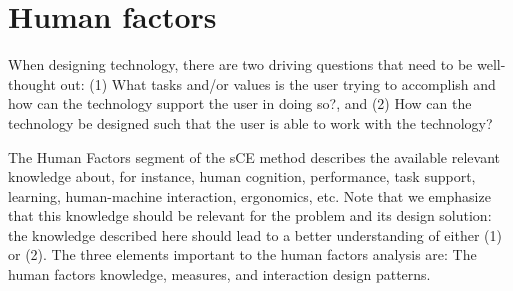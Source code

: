 \section{Human factors}
\label{sec:human-factors}
When designing technology, there are two driving questions that need to be well-thought out: (1) What tasks and/or values is the user trying to accomplish and how can the technology support the user in doing so?, and (2) How can the technology be designed such that the user is able to work with the technology?

The Human Factors segment of the sCE method describes the available relevant knowledge about, for instance, human cognition, performance, task support, learning, human-machine interaction, ergonomics, etc. Note that we emphasize that this knowledge should be relevant for the problem and its design solution: the knowledge described here should lead to a better understanding of either (1) or (2). The three elements important to the human factors analysis are: The human factors knowledge, measures, and interaction design patterns.

